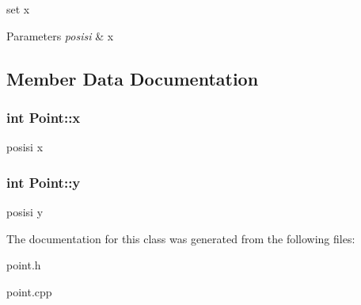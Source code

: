 set x 


\begin{DoxyParams}{Parameters}
{\em posisi} & x \\
\hline
\end{DoxyParams}


\subsection{Member Data Documentation}
\subsubsection[{\texorpdfstring{x}{x}}]{\setlength{\rightskip}{0pt plus 5cm}int Point\+::x\hspace{0.3cm}{\ttfamily [protected]}}\hypertarget{class_point_a8c779e11e694b20e0946105a9f5de842}{}\label{class_point_a8c779e11e694b20e0946105a9f5de842}
posisi x 
\subsubsection[{\texorpdfstring{y}{y}}]{\setlength{\rightskip}{0pt plus 5cm}int Point\+::y\hspace{0.3cm}{\ttfamily [protected]}}\hypertarget{class_point_a2e1b5fb2b2a83571f5c0bc0f66a73cf7}{}\label{class_point_a2e1b5fb2b2a83571f5c0bc0f66a73cf7}
posisi y 

The documentation for this class was generated from the following files\+:\begin{DoxyCompactItemize}
\item 
point.\+h\item 
point.\+cpp\end{DoxyCompactItemize}
